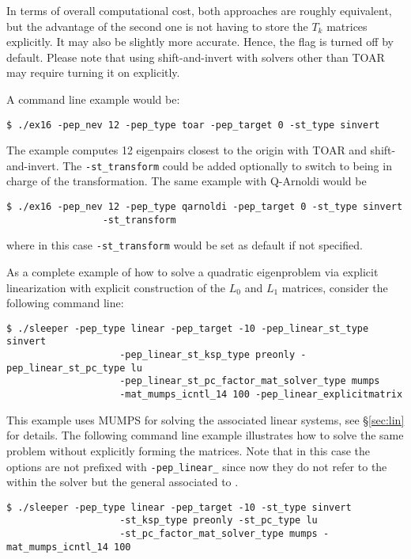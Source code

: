 In terms of overall computational cost, both approaches are roughly equivalent, but the advantage of the second one is not having to store the $T_k$ matrices explicitly. It may also be slightly more accurate. Hence, the  flag is turned off by default. Please note that using shift-and-invert with solvers other than TOAR may require turning it on explicitly.

A command line example would be:
	\begin{Verbatim}[fontsize=\small]
	$ ./ex16 -pep_nev 12 -pep_type toar -pep_target 0 -st_type sinvert
	\end{Verbatim}
The example computes 12 eigenpairs closest to the origin with TOAR and shift-and-invert. The \Verb!-st_transform! could be added optionally to switch to  being in charge of the transformation. The same example with Q-Arnoldi would be
	\begin{Verbatim}[fontsize=\small]
	$ ./ex16 -pep_nev 12 -pep_type qarnoldi -pep_target 0 -st_type sinvert
                 -st_transform
	\end{Verbatim}
where in this case \Verb!-st_transform! would be set as default if not specified.

As a complete example of how to solve a quadratic eigenproblem via explicit linearization with explicit construction of the $L_0$ and $L_1$ matrices, consider the following command line:
\begin{Verbatim}[fontsize=\small]
	$ ./sleeper -pep_type linear -pep_target -10 -pep_linear_st_type sinvert
                    -pep_linear_st_ksp_type preonly -pep_linear_st_pc_type lu
                    -pep_linear_st_pc_factor_mat_solver_type mumps
                    -mat_mumps_icntl_14 100 -pep_linear_explicitmatrix
\end{Verbatim}
This example uses MUMPS for solving the associated linear systems, see \S\ref{sec:lin} for details. The following command line example illustrates how to solve the same problem without explicitly forming the matrices. Note that in this case the  options are not prefixed with \texttt{-pep\_linear\_} since now they do not refer to the  within the  solver but the general  associated to .
\begin{Verbatim}[fontsize=\small]
	$ ./sleeper -pep_type linear -pep_target -10 -st_type sinvert
                    -st_ksp_type preonly -st_pc_type lu
                    -st_pc_factor_mat_solver_type mumps -mat_mumps_icntl_14 100
\end{Verbatim}

